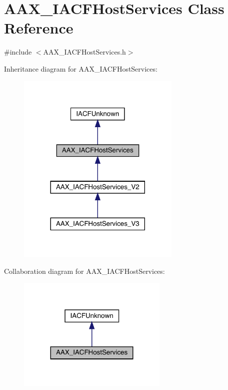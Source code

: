 \hypertarget{a01713}{}\section{A\+A\+X\+\_\+\+I\+A\+C\+F\+Host\+Services Class Reference}
\label{a01713}


{\ttfamily \#include $<$A\+A\+X\+\_\+\+I\+A\+C\+F\+Host\+Services.\+h$>$}



Inheritance diagram for A\+A\+X\+\_\+\+I\+A\+C\+F\+Host\+Services\+:
\nopagebreak
\begin{figure}[H]
\begin{center}
\leavevmode
\includegraphics[width=221pt]{a01712}
\end{center}
\end{figure}


Collaboration diagram for A\+A\+X\+\_\+\+I\+A\+C\+F\+Host\+Services\+:
\nopagebreak
\begin{figure}[H]
\begin{center}
\leavevmode
\includegraphics[width=203pt]{a01711}
\end{center}
\end{figure}


